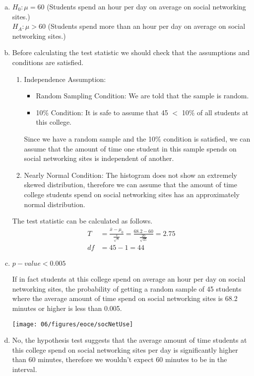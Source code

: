 {
\begin{enumerate}[(a)]
\setlength{\itemsep}{0mm}
\item $H_0: \mu = 60$ (Students spend an hour per day on average on social networking sites.) \\
$H_A: \mu > 60$ (Students spend more than an hour per day on average on social networking sites.)
\item Before calculating the test statistic we should check that the assumptions and conditions are satisfied.
\begin{enumerate}[1.]
\item Independence Assumption: 
\begin{itemize}
\item Random Sampling Condition: We are told that the sample is random.
\item 10\% Condition: It is safe to assume that 45 $<$ 10\% of all students at this college.
\end{itemize}
Since we have a random sample and the 10\% condition is satisfied, we can assume that the amount of time one student in this sample spends on social networking sites is independent of another.
\item Nearly Normal Condition: The histogram does not show an extremely skewed distribution, therefore we can assume that the amount of time college students spend on social networking sites has an approximately normal distribution.
\end{enumerate}

The test statistic can be calculated as follows.
\begin{align*}
T &= \frac{\bar{x} - \mu_0}{\frac{s}{\sqrt{n}}} = \frac{68.2 - 60}{\frac{20}{\sqrt{45}}} = 2.75\\
df &= 45 - 1 = 44
\end{align*}
\item $p-value < 0.005$ \\
\begin{minipage}[c]{0.5\textwidth}
If in fact students at this college spend on average an hour per day on social networking sites, the probability of getting a random sample of 45 students where the average amount of time spend on social networking sites is 68.2 minutes or higher is less than 0.005.
\end{minipage}
\begin{minipage}[c]{0.5\textwidth}
\begin{center}
\texttt{[image: 06/figures/eoce/socNetUse]}
\end{center}
\end{minipage}
\item No, the hypothesis test suggests that the average amount of time students at this college spend on social networking sites per day is significantly higher than 60 minutes, therefore we wouldn't expect 60 minutes to be in the interval.
\end{enumerate}
}\label{socNetUse}

